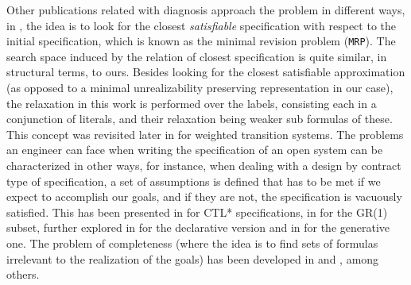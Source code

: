 Other publications related with diagnosis approach the problem in different ways, in \cite{DBLP:conf/icra/KimFS12}, the idea is to look for the closest \textit{satisfiable} specification with respect to the initial specification, which is known as the minimal revision problem (\texttt{MRP}).  The search space induced by the relation of closest specification is quite similar, in structural terms, to ours. Besides looking for the closest satisfiable approximation (as opposed to a minimal unrealizability preserving representation in our case), the relaxation in this work is performed over the labels, consisting each in a conjunction of literals, and their relaxation being weaker sub formulas of these.  This concept was revisited later in \cite{DBLP:conf/icra/KimF13} for weighted transition systems.
The problems an engineer can face when writing the specification
of an open system can be characterized in other ways, for instance, 
when dealing with a design by contract type of specification, a set of assumptions is defined that has to be met
if we expect to accomplish our goals, and
if they are not, the specification is vacuously satisfied.
This has been presented in \cite{kupferman2003vacuity}
for CTL* specifications, in \cite{DBLP:conf/hvc/KleinP10} for the
GR(1)\cite{DBLP:conf/vmcai/PitermanPS06} subset, further explored in \cite{DBLP:conf/sigsoft/MaozR16}
for the declarative version and in \cite{DBLP:phd/ethos/DIppolito13}
for the generative one.  
The problem of completeness (where the idea is to find sets of formulas
irrelevant to the realization of the goals) has been
developed in \cite{chockler2001practical} and \cite{chockler2001coverage},
among others.

